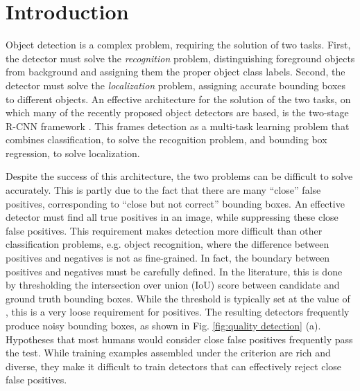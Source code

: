 \documentclass[10pt,journal,compsoc]{IEEEtran}
\begin{document}
\maketitle


\IEEEdisplaynontitleabstractindextext


\IEEEpeerreviewmaketitle

\section{Introduction}
\label{sec:intro}

Object detection is a complex problem, requiring the solution of two tasks.
First, the detector must solve the {\it recognition\/} problem, distinguishing
foreground objects from background and assigning them the proper
object class labels. Second, the detector must solve the
{\it localization\/} problem, assigning accurate bounding boxes to different
objects. An effective architecture for the solution of the two tasks,
on which many of the recently proposed object detectors are based, is the
two-stage R-CNN framework \cite{DBLP:conf/cvpr/GirshickDDM14,DBLP:conf/iccv/Girshick15,DBLP:conf/nips/RenHGS15,lin2017feature}.
This frames detection as a multi-task learning problem
that combines classification, to solve the recognition problem,
and bounding box regression, to solve localization.

Despite the success of this architecture, the two problems can be
difficult to solve accurately. This is partly due to the fact that there are
many ``close'' false positives, corresponding to ``close but not correct''
bounding boxes. An effective detector must find all true positives in an
image, while suppressing these close false positives. This requirement makes
detection more difficult than other classification problems, e.g. object
recognition, where the difference between positives and negatives is not as
fine-grained. In fact, the boundary between positives and negatives must
be carefully defined. In the literature, this is done
by thresholding the intersection over union (IoU) score between candidate
and ground truth bounding boxes. While the threshold is typically set at
the value of , this is a very loose requirement for positives.
The resulting detectors frequently produce noisy bounding
boxes, as shown in Fig. \ref{fig:quality detection} (a).
Hypotheses that most humans would consider close false positives frequently pass
the  test. While training examples assembled under the  criterion are rich and diverse, they make it difficult to train detectors that can effectively
reject close false positives.
\end{document}
